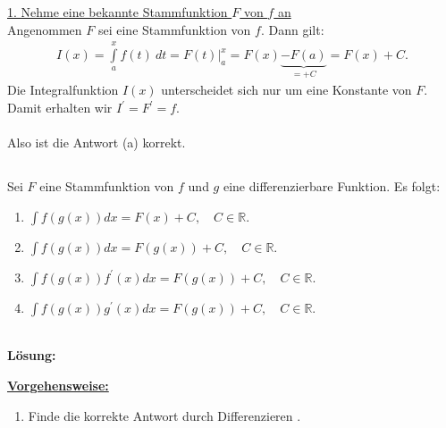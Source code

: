 \underline{1. Nehme eine bekannte Stammfunktion $ F $ von $ f $ an}\\
Angenommen $ F $ sei eine Stammfunktion von $ f $.
Dann gilt:
\begin{align*}
I(x)
=
\int \limits_{a}^x f(t) \ dt
=
F(t) \bigg|_a^x
=
F(x) \underbrace{- F(a)}_{ = + C}
= F(x) + C.
\end{align*}
Die Integralfunktion $ I(x) $ unterscheidet sich nur um eine Konstante von $ F $.
Damit erhalten wir $ I^\prime = F^\prime =f $.\\
\\
Also ist die Antwort (a) korrekt. 
\newpage
\subsection*{}
Sei $ F $ eine Stammfunktion von $ f $ und $ g $ eine differenzierbare Funktion.
Es folgt:
\renewcommand{\labelenumi}{(\alph{enumi})}
\begin{enumerate}
	\item 
	$ \int f(g(x)) dx = F(x) +C, \quad C \in \mathbb{R} $.
	\item 
	$ \int f(g(x)) dx = F(g(x)) +C, \quad C \in \mathbb{R} $.
	\item 
	$ \int f(g(x)) f^\prime(x) dx = F(g(x)) +C, \quad C \in \mathbb{R} $.
	\item 
	$ \int f(g(x)) g^\prime(x) dx = F(g(x)) +C, \quad C \in \mathbb{R} $.
\end{enumerate}
\ \\
\textbf{Lösung:}
\begin{mdframed}
\underline{\textbf{Vorgehensweise:}}
\renewcommand{\labelenumi}{\theenumi.}
\begin{enumerate}
\item Finde die korrekte Antwort durch Differenzieren .
\end{enumerate}
\end{mdframed}

